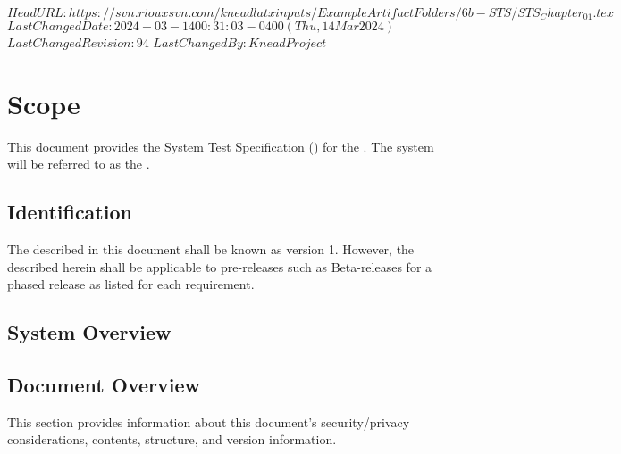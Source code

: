 \svnidlong
{$HeadURL: https://svn.riouxsvn.com/kneadlatxinputs/ExampleArtifactFolders/6b-STS/STS_Chapter_01.tex $}
{$LastChangedDate: 2024-03-14 00:31:03 -0400 (Thu, 14 Mar 2024) $}
{$LastChangedRevision: 94 $}
{$LastChangedBy: KneadProject $}

\chapter{Scope}
\label{chap:Scope}
% 

This document provides the System Test Specification (\STS) for the \ThisSystem. 
The system will be referred to as the \ThisSys.

\section{Identification}
\label{sec:Identification}
% 

The \ThisSystem described in this document shall be known as \ThisSys version 1.
However, the \STS described herein shall be applicable to pre-releases such as Beta-releases for a phased release as listed for each requirement.

\section{System Overview}
\label{sec:SystemOverview}
% 




\section{Document Overview}
\label{loc:DocumentOverview}
% 

This section provides information about this document's security/privacy considerations, contents, structure, and version information.







